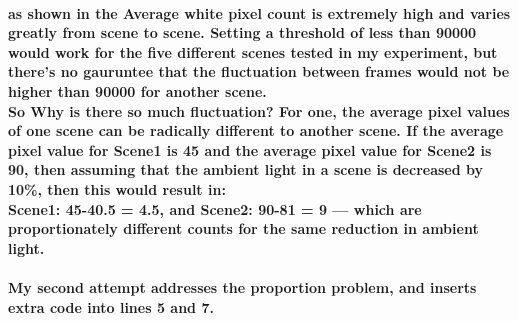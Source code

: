 \documentclass[11pt]{article} %
\begin{document}
\paragraph{as shown in  the Average white pixel count is extremely high and varies greatly from scene to scene. Setting a threshold of less than 90000 would work for the five different scenes tested in my experiment, but there’s no gauruntee that the fluctuation between frames would not be higher than 90000 for another scene. \\
So Why is there so much fluctuation? For one, the average pixel values of one scene can be radically different to another scene. If the average pixel value for Scene1 is 45 and the average pixel value for Scene2 is 90, then assuming that the ambient light in a scene is decreased by 10\%, then this would result in:\\
Scene1:  45-40.5 = 4.5, and Scene2: 90-81 = 9 --- which are proportionately different counts for the same reduction in ambient light.\\
 }
\paragraph{My second attempt addresses the proportion problem, and inserts extra code into lines 5 and 7.}
\begin{frame}[fragile]

\end{frame}
\end{document}
